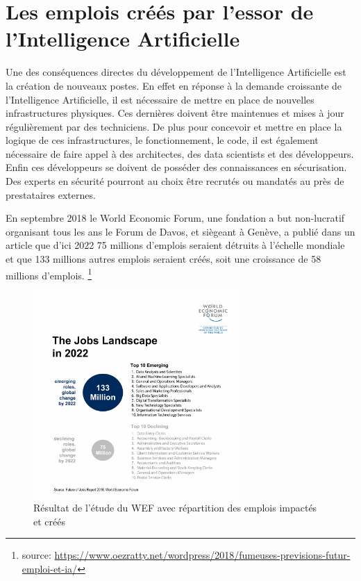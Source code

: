     \newpage

    \section{Les emplois créés par l'essor de l'Intelligence Artificielle}

    Une des conséquences directes du développement de l'Intelligence Artificielle est la création de nouveaux postes.
    En effet en réponse à la demande croissante de l'Intelligence Artificielle, il est nécessaire de mettre en place
    de nouvelles infrastructures physiques. Ces dernières doivent être maintenues et mises à jour régulièrement par des techniciens.
    De plus pour concevoir et mettre en place la logique de ces infrastructures, le fonctionnement, le code, il est également nécessaire de
    faire appel à des architectes, des data scientists et des développeurs. Enfin ces développeurs se doivent de posséder des connaissances
    en sécurisation. Des experts en sécurité pourront au choix être recrutés ou mandatés au près de prestataires externes. \newline

    En septembre 2018 le World Economic Forum, une fondation a but non-lucratif organisant tous les ans le Forum de Davos,
    et siègeant à Genève, a publié dans un article que d'ici 2022 75 millions d'emplois seraient détruits à l'échelle mondiale et
    que 133 millions autres emplois seraient créés, soit une croissance de 58 millions d'emplois.
    \footnote{source: \url{https://www.oezratty.net/wordpress/2018/fumeuses-previsions-futur-emploi-et-ia/}}
    \newline

    \begin{figure}[H]
        \centering
        \includegraphics[width=0.7\textwidth]{Images/futurejobs}
        \caption{Résultat de l'étude du WEF avec répartition des emplois impactés et créés}
        \label{fig:explicability}
    \end{figure}

